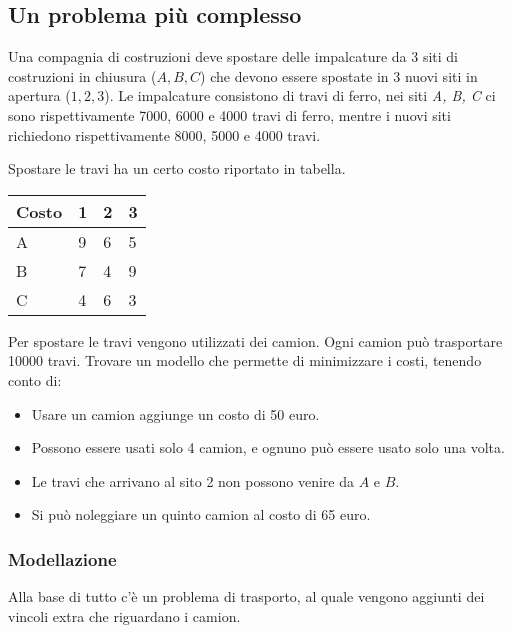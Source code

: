 \subsection{Un problema più complesso}

Una compagnia di costruzioni deve spostare delle impalcature da 3 siti di costruzioni in chiusura ($A,B,C$) che devono essere spostate in 3 nuovi siti in apertura ($1,2,3$).
Le impalcature consistono di travi di ferro, nei siti \textit{A, B, C} ci sono rispettivamente 7000, 6000 e 4000 travi di ferro, mentre i nuovi siti richiedono rispettivamente 8000, 5000 e 4000 travi. 

Spostare le travi ha un certo costo riportato in tabella.

\begin{table}[htbp]
	\centering
	\begin{tabular}{|l|l|l|l|}
		\hline
		Costo & 1 & 2 & 3 \\ \hline
		A    & 9 & 6 & 5 \\ \hline
		B    & 7 & 4 & 9 \\ \hline
		C    & 4 & 6 & 3 \\ \hline
	\end{tabular}
\end{table}

Per spostare le travi vengono utilizzati dei camion. Ogni camion può trasportare 10000 travi.
Trovare un modello che permette di minimizzare i costi, tenendo conto di:

\begin{itemize}
	\item Usare un camion aggiunge un costo di 50 euro.
	\item Possono essere usati solo 4 camion, e ognuno può essere usato solo una volta.
	\item Le travi che arrivano al sito 2 non possono venire da $A$ e $B$.
	\item Si può noleggiare un quinto camion al costo di 65 euro.
\end{itemize} 

\subsubsection{Modellazione}

Alla base di tutto c'è un problema di trasporto, al quale vengono aggiunti dei vincoli extra che riguardano i camion.

